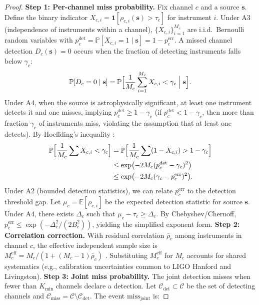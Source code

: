 \documentclass[11pt,a4paper]{article}
\theoremstyle{definition}
\newcommand{\E}{\mathbb{E}}
\newcommand{\Pbb}{\mathbb{P}}
\newcommand{\ind}[1]{\mathbf{1}[#1]}
\begin{document}
\begin{proof}
\textbf{Step 1: Per-channel miss probability.}
Fix channel $c$ and a source $\mathbf{s}$. Define the binary indicator $X_{c,i} = \ind{\rho_{c,i}(\mathbf{s}) > \tau_c}$ for instrument $i$. Under A3 (independence of instruments within a channel), $\{X_{c,i}\}_{i=1}^{M_c}$ are i.i.d.\ Bernoulli random variables with $p_c^{\mathrm{det}} = \Pbb[X_{c,i} = 1 \mid \mathbf{s}] = 1 - p_c^{\mathrm{err}}$.
A missed channel detection $D_c(\mathbf{s}) = 0$ occurs when the fraction of detecting instruments falls below $\gamma_c$:
\begin{equation}
\Pbb[D_c = 0 \mid \mathbf{s}] = \Pbb\Bigl[\frac{1}{M_c}\sum_{i=1}^{M_c} X_{c,i} < \gamma_c \;\Big|\; \mathbf{s}\Bigr].
\end{equation}
Under A4, when the source is astrophysically significant, at least one instrument detects it and one misses, implying $p_c^{\mathrm{det}} \geq 1 - \gamma_c$ (if $p_c^{\mathrm{det}} < 1-\gamma_c$, then more than fraction $\gamma_c$ of instruments miss, violating the assumption that at least one detects). By Hoeffding's inequality \cite{Hoeffding1963}:
\begin{align}
\Pbb\Bigl[\frac{1}{M_c}\sum X_{c,i} < \gamma_c\Bigr] 
&= \Pbb\Bigl[\frac{1}{M_c}\sum (1 - X_{c,i}) > 1 - \gamma_c\Bigr] \nonumber \\
&\leq \exp\bigl(-2M_c (p_c^{\mathrm{det}} - \gamma_c)^2 \bigr) \nonumber \\
&\leq \exp\bigl(-2M_c (\gamma_c - p_c^{\mathrm{err}})^2 \bigr).
\end{align}
Under A2 (bounded detection statistics), we can relate $p_c^{\mathrm{err}}$ to the detection threshold gap. Let $\mu_c = \E[\rho_{c,i}]$ be the expected detection statistic for source $\mathbf{s}$. Under A4, there exists $\Delta_c$ such that $\mu_c - \tau_c \geq \Delta_c$. By Chebyshev/Chernoff, $p_c^{\mathrm{err}} \leq \exp(-\Delta_c^2/(2 B_c^2))$, yielding the simplified exponent form.
\textbf{Step 2: Correlation correction.}
With residual correlation $\bar{\rho}_c$ among instruments in channel $c$, the effective independent sample size is $M_c^{\mathrm{eff}} = M_c/(1 + (M_c-1)\bar{\rho}_c)$ \cite{Liang1986}. Substituting $M_c^{\mathrm{eff}}$ for $M_c$ accounts for shared systematics (e.g., calibration uncertainties common to LIGO Hanford and Livingston).
\textbf{Step 3: Joint miss probability.}
The joint detection misses when fewer than $K_{\mathrm{min}}$ channels declare a detection. Let $\mathcal{C}_{\mathrm{det}} \subset \mathcal{C}$ be the set of detecting channels and $\mathcal{C}_{\mathrm{miss}} = \mathcal{C} \setminus \mathcal{C}_{\mathrm{det}}$. The event $\text{miss}_{\mathrm{joint}}$ is:

\end{proof}
\end{document}
